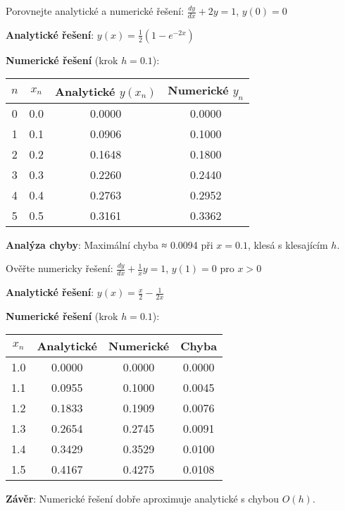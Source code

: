 \vspace{0.6\baselineskip}

\begin{example}
Porovnejte analytické a numerické řešení: $\frac{dy}{dx} + 2y = 1$, $y(0) = 0$
\vspace{0.3\baselineskip}

\textbf{Analytické řešení}: $y(x) = \frac{1}{2}(1 - e^{-2x})$

\textbf{Numerické řešení} (krok $h = 0.1$):
\begin{center}
\begin{tabular}{c|c|c|c}
$n$ & $x_n$ & Analytické $y(x_n)$ & Numerické $y_n$ \\
\hline
0 & 0.0 & 0.0000 & 0.0000 \\
1 & 0.1 & 0.0906 & 0.1000 \\
2 & 0.2 & 0.1648 & 0.1800 \\
3 & 0.3 & 0.2260 & 0.2440 \\
4 & 0.4 & 0.2763 & 0.2952 \\
5 & 0.5 & 0.3161 & 0.3362 \\
\end{tabular}
\end{center}

\textbf{Analýza chyby}: Maximální chyba ≈ 0.0094 při $x=0.1$, klesá s klesajícím $h$.
\end{example}

\vspace{0.6\baselineskip}

\begin{example}
Ověřte numericky řešení: $\frac{dy}{dx} + \frac{1}{x}y = 1$, $y(1) = 0$ pro $x > 0$
\vspace{0.3\baselineskip}

\textbf{Analytické řešení}: $y(x) = \frac{x}{2} - \frac{1}{2x}$

\textbf{Numerické řešení} (krok $h = 0.1$):
\begin{center}
\begin{tabular}{c|c|c|c}
$x_n$ & Analytické & Numerické & Chyba \\
\hline
1.0 & 0.0000 & 0.0000 & 0.0000 \\
1.1 & 0.0955 & 0.1000 & 0.0045 \\
1.2 & 0.1833 & 0.1909 & 0.0076 \\
1.3 & 0.2654 & 0.2745 & 0.0091 \\
1.4 & 0.3429 & 0.3529 & 0.0100 \\
1.5 & 0.4167 & 0.4275 & 0.0108 \\
\end{tabular}
\end{center}

\textbf{Závěr}: Numerické řešení dobře aproximuje analytické s chybou $O(h)$.
\end{example}

